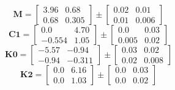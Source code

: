 \documentclass[../../report/parameterReport.tex]{subfiles}
\begin{document}
\begin{equation}
\mathbf{M}=
\left[
\begin{array}{rr}
    3.96 & 0.68\\
    0.68 & 0.305
\end{array}
\right]
\pm
\left[
\begin{array}{rr}
    0.02 & 0.01\\
    0.01 & 0.006
\end{array}
\right]
\label{eq:M}
\end{equation}
\begin{equation}
\mathbf{C1}=
\left[
\begin{array}{rr}
    0.0 & 4.70\\
    -0.554 & 1.05
\end{array}
\right]
\pm
\left[
\begin{array}{rr}
    0.0 & 0.03\\
    0.005 & 0.02
\end{array}
\right]
\label{eq:C1}
\end{equation}
\begin{equation}
\mathbf{K0}=
\left[
\begin{array}{rr}
    -5.57 & -0.94\\
    -0.94 & -0.311
\end{array}
\right]
\pm
\left[
\begin{array}{rr}
    0.03 & 0.02\\
    0.02 & 0.008
\end{array}
\right]
\label{eq:K0}
\end{equation}
\begin{equation}
\mathbf{K2}=
\left[
\begin{array}{rr}
    0.0 & 6.16\\
    0.0 & 1.03
\end{array}
\right]
\pm
\left[
\begin{array}{rr}
    0.0 & 0.03\\
    0.0 & 0.02
\end{array}
\right]
\label{eq:K2}
\end{equation}
\end{document}
